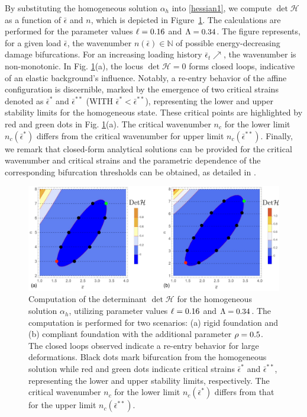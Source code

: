 % 
By substituting the homogeneous solution $\alpha_h$ into \eqref{hessian1}, we compute $\det \mathcal{H}$ as a function of $\bar \epsilon$ and $n$, which is depicted in Figure~\ref{fig:hessian1}. The calculations are performed for the parameter values $\ell=0.16$ and $\Lambda=0.34$.
The figure represents, for a given load $\bar \epsilon$, the wavenumber $n(\bar \epsilon)\in \mathbb N$ of possible energy-decreasing damage bifurcations. For an increasing loading history $\bar \epsilon_t\nearrow$, the wavenumber is non-monotonic.
In Fig. \ref{fig:hessian1}(a), the locus $\det \mathcal H=0$ forms closed loops, indicative of an elastic background's influence. Notably, a re-entry behavior of the affine configuration is discernible, marked by the emergence of two critical strains denoted as $\bar\epsilon^*$ and $\bar\epsilon^{**}$ (WITH $\bar\epsilon^* < \bar\epsilon^{**}$), representing the lower and upper stability limits for the homogeneous state. These critical points are highlighted by red and green dots in Fig. \ref{fig:hessian1}(a). The critical wavenumber $n_c$ for the lower limit $n_c(\bar{\epsilon}^*)$    differs from the critical wavenumber for  upper limit $n_c(\bar{\epsilon}^{**})$. Finally, we remark that closed-form analytical solutions can be provided for the critical wavenumber and critical strains and the parametric dependence of the corresponding bifurcation thresholds can be obtained, as detailed in \cite{Salman2021-mn}.


\begin{figure}
     \centering
     \includegraphics[scale=0.25]{./final_images/fig1.pdf}
\caption{
Computation of the determinant $\det \mathcal{H}$ for the homogeneous solution $\alpha_h$, utilizing parameter values $\ell=0.16$ and $\Lambda = 0.34$. The computation is performed for two scenarios: (a) rigid foundation and (b) compliant foundation with the additional parameter $\rho =0.5$. The closed loops observed indicate a re-entry behavior for large deformations. Black dots mark bifurcation from the homogeneous solution while red and green dots indicate critical strains $\bar{\epsilon}^*$ and $\bar{\epsilon}^{**}$, representing the lower and upper stability limits, respectively. The critical wavenumber $n_c$ for the lower limit $n_c(\bar{\epsilon}^*)$ differs from that for the upper limit $n_c(\bar{\epsilon}^{**})$.}
     \label{fig:hessian1}
 \end{figure}

